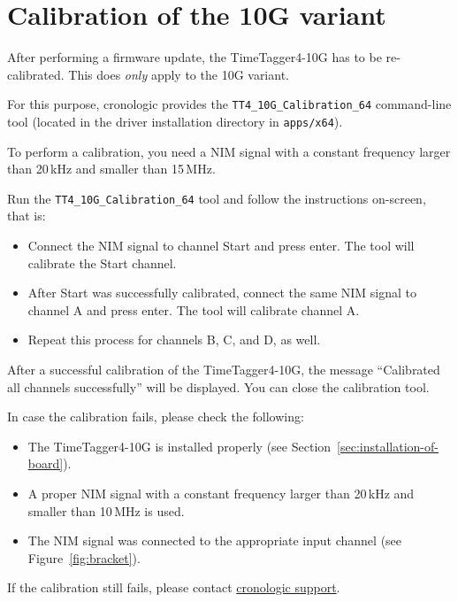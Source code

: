 \section{Calibration of the 10G variant}

After performing a firmware update, the TimeTagger4-10G has to be re-calibrated.
This does \emph{only} apply to the 10G variant.

For this purpose, cronologic provides the \texttt{TT4\_10G\_Calibration\_64} command-line tool (located in the driver installation directory in 
\texttt{apps/x64}).

To perform a calibration, you need a NIM signal with a constant frequency larger than 20\,kHz and smaller than 15\,MHz.

Run the \texttt{TT4\_10G\_Calibration\_64} tool and follow the instructions on-screen, that is:

\begin{itemize}
    \item Connect the NIM signal to channel Start and press enter. The tool will calibrate the Start channel.
    \item After Start was successfully calibrated, connect the same NIM signal to channel A and press enter. The tool will calibrate channel A.
    \item Repeat this process for channels B, C, and D, as well.
\end{itemize}

After a successful calibration of the TimeTagger4-10G, the message ``Calibrated all channels successfully'' will be displayed.
You can close the calibration tool.

In case the calibration fails, please check the following:
\begin{itemize}
    \item The TimeTagger4-10G is installed properly (see Section~\ref{sec:installation-of-board}).
    \item A proper NIM signal with a constant frequency larger than 20\,kHz and smaller than 10\,MHz is used.
    \item The NIM signal was connected to the appropriate input channel (see Figure~\ref{fig:bracket}).
\end{itemize}

If the calibration still fails, please contact \href{https://www.cronologic.de/contact}{cronologic support}.